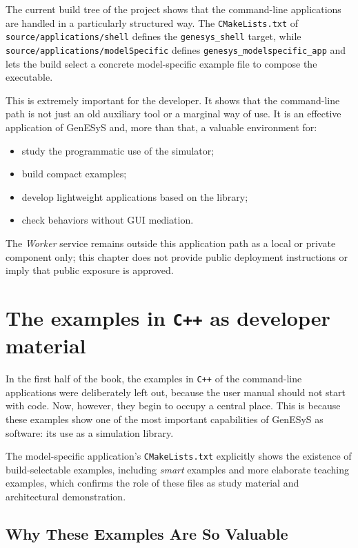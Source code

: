 The current build tree of the project shows that the command-line applications are handled in a particularly structured way. The \texttt{CMakeLists.txt} of \texttt{source/applications/shell} defines the \texttt{genesys\_shell} target, while \texttt{source/applications/modelSpecific} defines \texttt{genesys\_modelspecific\_app} and lets the build select a concrete model-specific example file to compose the executable.

This is extremely important for the developer. It shows that the command-line path is not just an old auxiliary tool or a marginal way of use. It is an effective application of GenESyS and, more than that, a valuable environment for:
\begin{itemize}
 \item study the programmatic use of the simulator;
 \item build compact examples;
 \item develop lightweight applications based on the library;
 \item check behaviors without GUI mediation.
\end{itemize}

The \textit{Worker} service remains outside this application path as a local or private component only; this chapter does not provide public deployment instructions or imply that public exposure is approved.

\section{The examples in \texttt{C++} as developer material}
\label{sec:cap10_exemplos_cpp_material_desenvolvedor}

In the first half of the book, the examples in \texttt{C++} of the command-line applications were deliberately left out, because the user manual should not start with code. Now, however, they begin to occupy a central place. This is because these examples show one of the most important capabilities of GenESyS as software: its use as a simulation library.

The model-specific application's \texttt{CMakeLists.txt} explicitly shows the existence of build-selectable examples, including \textit{smart} examples and more elaborate teaching examples, which confirms the role of these files as study material and architectural demonstration.

\subsection{Why These Examples Are So Valuable}
\label{subsec:cap10_por_que_exemplos_tao_valiosos}

